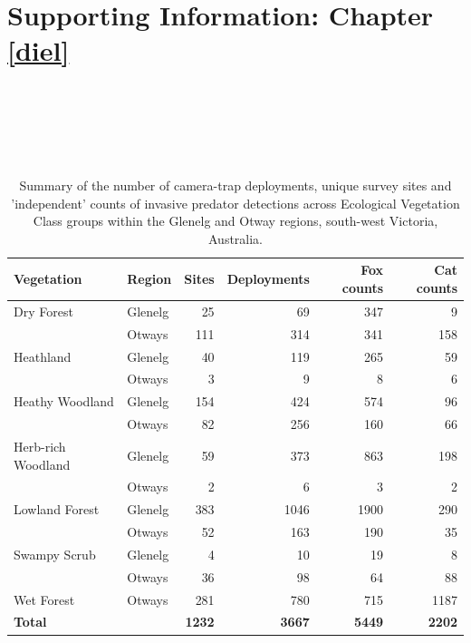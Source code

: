 \documentclass[11pt,a4paper,titlepage,twoside,openright]{style/unimelbthesis}
\begin{document}
\begin{mainmatter}
\newpage

\hypertarget{diel-app}{%
\chapter{Supporting Information: Chapter \ref{diel}}\label{diel-app}}

\newpage

\(~\)

\(~\)

\(~\)

\begingroup\fontsize{10}{12}\selectfont
\begin{longtable}[t]{llrrrr}
\caption{\label{tab:diel-tab1}Summary of the number of camera-trap deployments, unique survey sites and 'independent' counts of invasive predator detections across Ecological Vegetation Class groups within the Glenelg and Otway regions, south-west Victoria, Australia.}\\
\toprule
Vegetation & Region & Sites & Deployments & Fox counts & Cat counts\\
\midrule
Dry Forest & Glenelg & 25 & 69 & 347 & 9\\
 & Otways & 111 & 314 & 341 & 158\\
Heathland & Glenelg & 40 & 119 & 265 & 59\\
 & Otways & 3 & 9 & 8 & 6\\
Heathy Woodland & Glenelg & 154 & 424 & 574 & 96\\
\addlinespace
 & Otways & 82 & 256 & 160 & 66\\
Herb-rich Woodland & Glenelg & 59 & 373 & 863 & 198\\
 & Otways & 2 & 6 & 3 & 2\\
Lowland Forest & Glenelg & 383 & 1046 & 1900 & 290\\
 & Otways & 52 & 163 & 190 & 35\\
\addlinespace
Swampy Scrub & Glenelg & 4 & 10 & 19 & 8\\
 & Otways & 36 & 98 & 64 & 88\\
Wet Forest & Otways & 281 & 780 & 715 & 1187\\
\textbf{Total} & \textbf{} & \textbf{1232} & \textbf{3667} & \textbf{5449} & \textbf{2202}\\
\bottomrule
\end{longtable}
\endgroup{}

\newpage


\end{mainmatter}
\end{document}
